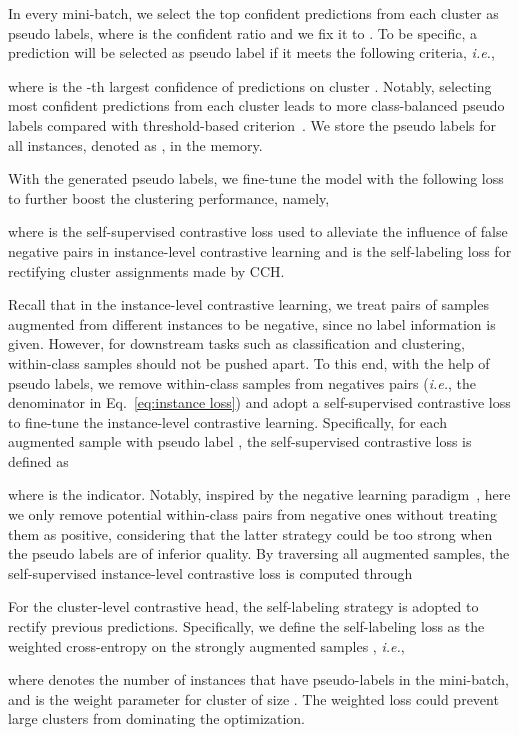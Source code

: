 In every mini-batch, we select the top  confident predictions from each cluster as pseudo labels, where  is the confident ratio and we fix it to . To be specific, a prediction  will be selected as pseudo label if it meets the following criteria, \textit{i.e.},

where  is the -th largest confidence of predictions on cluster . Notably, selecting most confident predictions from each cluster leads to more class-balanced pseudo labels compared with threshold-based criterion~\citep{SCAN, RUC, SPICE}. We store the pseudo labels for all instances, denoted as , in the memory.

With the generated pseudo labels, we fine-tune the model with the following loss to further boost the clustering performance, namely,

where  is the self-supervised contrastive loss used to alleviate the influence of false negative pairs in instance-level contrastive learning and  is the self-labeling loss for rectifying cluster assignments made by CCH. 

Recall that in the instance-level contrastive learning, we treat pairs of samples augmented from different instances to be negative, since no label information is given. However, for downstream tasks such as classification and clustering, within-class samples should not be pushed apart. To this end, with the help of pseudo labels, we remove within-class samples from negatives pairs (\textit{i.e.}, the denominator in Eq.~\ref{eq:instance loss}) and adopt a self-supervised contrastive loss to fine-tune the instance-level contrastive learning. Specifically, for each augmented sample  with pseudo label , the self-supervised contrastive loss is defined as

where  is the indicator. Notably, inspired by the negative learning paradigm~\citep{kim2019nlnl}, here we only remove potential within-class pairs from negative ones without treating them as positive, considering that the latter strategy could be too strong when the pseudo labels are of inferior quality. By traversing all augmented samples, the self-supervised instance-level contrastive loss is computed through


For the cluster-level contrastive head, the self-labeling strategy is adopted to rectify previous predictions. Specifically, we define the self-labeling loss as the weighted cross-entropy on the strongly augmented samples , \textit{i.e.},

where  denotes the number of instances that have pseudo-labels in the mini-batch, and  is the weight parameter for cluster  of size . The weighted loss could prevent large clusters from dominating the optimization.

